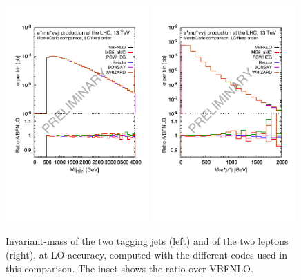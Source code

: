 \begin{figure}[h!]
   \centering
   \includegraphics[width=0.49\textwidth,angle=0,clip=true,trim={0.4cm 2.5cm 0.cm 1.cm}]{figures/mjj_LO.pdf}
   \includegraphics[width=0.49\textwidth,angle=0,clip=true,trim={0.4cm 2.5cm 0.cm 1.cm}]{figures/mll_LO.pdf}
\caption{\label{fig:wg1_mjj-llLO} Invariant-mass of the two tagging jets (left) and of the two leptons (right), at LO accuracy, 
computed with the different codes used in this comparison. The inset shows the ratio over {\sc VBFNLO}.
}
\end{figure}
%
